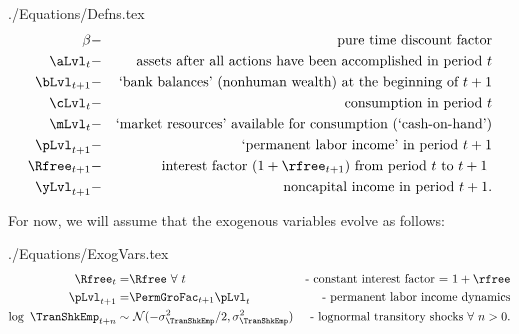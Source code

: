 \documentclass[titlepage, headings=optiontotocandhead]{\econtex}
\begin{document}
\begin{verbatimwrite}{./Equations/Defns.tex}
  \begin{equation*}\begin{gathered}\begin{aligned}
        {\DiscAlt} & - & \text{pure time discount factor} \\
        {\aLvl}_{t} & - & \text{assets after all actions have been accomplished in period $t$} \\
        {\bLvl}_{t+1} & - & \text{`bank balances' (nonhuman wealth) at the beginning of $t+1$} \\
        {\cLvl}_{t} & - & \text{consumption in period $t$} \\
        {\mLvl}_{t} & - & \text{`market resources' available for consumption (`cash-on-hand')} \\
        \pLvl_{t+1} & - & \text{`permanent labor income' in period $t+1$} \\
        \Rfree_{t+1} & - & \text{interest factor $(1+\rfree_{t+1})$ from period $t$ to $t+1$ } \\
        {\yLvl}_{t+1} & - & \text{noncapital income in period $t+1$}.
      \end{aligned}\end{gathered}\end{equation*}
\end{verbatimwrite}
\unskip

For now, we will assume that the exogenous variables evolve as follows: 
\begin{verbatimwrite}{./Equations/ExogVars.tex}
  \begin{equation}\begin{gathered}\begin{aligned}
        \Rfree_{t}   = & \Rfree~\forall~t & \text{- constant interest factor = $1+\rfree$}  \notag
        \\ \pLvl_{t+1}  = & \PermGroFac_{t+1}\pLvl_{t} &   \text{- permanent labor income dynamics} \label{eq:permincgrow} 
        \\ \log ~ \TranShkEmp_{t+n} \sim &  ~\mathcal{N}(-\sigma_{\TranShkEmp}^{2}/2,\sigma_{\TranShkEmp}^{2}) & \text{- lognormal transitory shocks}~\forall~n>0 \notag.
      \end{aligned}\end{gathered}\end{equation}
\end{verbatimwrite}

\end{document}
